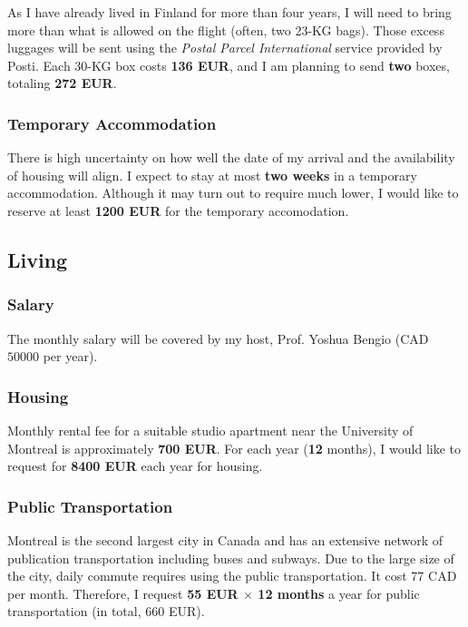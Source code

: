 \documentclass[11pt, oneside]{essay}
\begin{document}
As I have already lived in Finland for more than four years,
I will need to bring more than what is allowed on the flight
(often, two 23-KG bags). Those excess luggages will be sent
using the \textit{Postal Parcel International} service
provided by Posti. Each 30-KG box costs \textbf{136 EUR},
and I am planning to send \textbf{two} boxes, totaling
\textbf{272 EUR}.

\subsubsection{Temporary Accommodation}

There is high uncertainty on how well the date of my arrival and
the availability of housing will align. I expect to stay at most
\textbf{two weeks} in a temporary accommodation. Although it may
turn out to require much lower, I would like to reserve at least
\textbf{1200 EUR} for the temporary accomodation.


\subsection{Living}

\subsubsection{Salary}

The monthly salary will be covered by my
host, Prof. Yoshua Bengio (CAD $50000$ per year).

\subsubsection{Housing}

Monthly rental fee for a suitable studio apartment near the
University of Montreal is approximately \textbf{700 EUR}. For
each year (\textbf{12} months), I would like to request for
\textbf{8400 EUR} each year for housing.

\subsubsection{Public Transportation}

Montreal is the second largest city in Canada and has an
extensive network of publication transportation including buses
and subways. Due to the large size of the city, daily commute
requires using the public transportation. It cost 77 CAD per
month. Therefore, I request \textbf{55 EUR $\times$ 12 months} a
year for public transportation (in total, 660 EUR).








%
%
\end{document}

